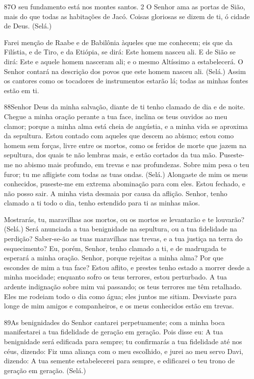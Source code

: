 \bigskip

\lettrine{87}{}O seu fundamento está nos montes santos. 2 O
Senhor ama as portas de Sião, mais do que todas as habitações de
Jacó. Coisas gloriosas se dizem de ti, ó cidade de Deus. (Selá.)

Farei menção de Raabe e de Babilônia àqueles que me conhecem; eis
que da Filístia, e de Tiro, e da Etiópia, se dirá: Este homem nasceu
ali. E de Sião se dirá: Este e aquele homem nasceram ali; e o
mesmo Altíssimo a estabelecerá. O Senhor contará na descrição
dos povos que este homem nasceu ali. (Selá.) Assim os cantores
como os tocadores de instrumentos estarão lá; todas as minhas fontes
estão em ti.

\bigskip

\lettrine{88}{}Senhor Deus da minha salvação, diante de ti
tenho clamado de dia e de noite. Chegue a minha oração perante a
tua face, inclina os teus ouvidos ao meu clamor; porque a minha
alma está cheia de angústia, e a minha vida se aproxima da
sepultura. Estou contado com aqueles que descem ao abismo; estou
como homem sem forças, livre entre os mortos, como os feridos de
morte que jazem na sepultura, dos quais te não lembras mais, e estão
cortados da tua mão. Puseste-me no abismo mais profundo, em
trevas e nas profundezas. Sobre mim pesa o teu furor; tu me
afligiste com todas as tuas ondas. (Selá.) Alongaste de mim os
meus conhecidos, puseste-me em extrema abominação para com eles.
Estou fechado, e não posso sair. A minha vista desmaia por causa
da aflição. Senhor, tenho clamado a ti todo o dia, tenho estendido
para ti as minhas mãos.

Mostrarás, tu, maravilhas aos mortos, ou os mortos se levantarão
e te louvarão? (Selá.) Será anunciada a tua benignidade na
sepultura, ou a tua fidelidade na perdição? Saber-se-ão as
tuas maravilhas nas trevas, e a tua justiça na terra do
esquecimento? Eu, porém, Senhor, tenho clamado a ti, e de
madrugada te esperará a minha oração. Senhor, porque rejeitas
a minha alma? Por que escondes de mim a tua face? Estou
aflito, e prestes tenho estado a morrer desde a minha mocidade;
enquanto sofro os teus terrores, estou perturbado. A tua
ardente indignação sobre mim vai passando; os teus terrores me têm
retalhado. Eles me rodeiam todo o dia como água; eles juntos
me sitiam. Desviaste para longe de mim amigos e companheiros,
e os meus conhecidos estão em trevas.

\bigskip

\lettrine{89}{}As benignidades do Senhor cantarei
perpetuamente; com a minha boca manifestarei a tua fidelidade de
geração em geração. Pois disse eu: A tua benignidade será
edificada para sempre; tu confirmarás a tua fidelidade até nos céus,
dizendo: Fiz uma aliança com o meu escolhido, e jurei ao meu
servo Davi, dizendo: A tua semente estabelecerei para sempre, e
edificarei o teu trono de geração em geração. (Selá.)

